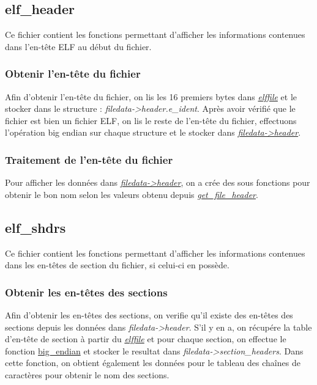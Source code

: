 \documentclass[a4paper]{article} %
\begin{document}

\subsection{elf\_header}
\label{sec:elfheader}
\noindent Ce fichier contient les fonctions permettant d'afficher les informations 
contenues dans l'en-tête ELF au début du fichier.

\subsubsection*{Obtenir l'en-tête du fichier}
\label{sec:getfheader}
Afin d'obtenir l'en-tête du fichier, on lis les 16 premiers bytes dans \hyperref[sec:elffile]{\textit{elffile}}
et le stocker dans le structure : \textit{filedata->header.e\_ident}.
Après avoir vérifié que le fichier est bien un fichier ELF, on lis le 
reste de l'en-tête du fichier, effectuons l'opération big endian sur chaque 
structure et le stocker dans \hyperref[sec:filedata]{\textit{filedata->header}}.

\subsubsection*{Traitement de l'en-tête du fichier}
Pour afficher les données dans \hyperref[sec:filedata]{\textit{filedata->header}}, 
on a crée des sous fonctions pour obtenir le bon nom selon les valeurs obtenu depuis 
\hyperref[sec:getfheader]{\textit{get\_file\_header}}.




\subsection{elf\_shdrs}
\label{sec:sectionheader}
\noindent Ce fichier contient les fonctions permettant d'afficher les informations 
contenues dans les en-têtes de section du fichier, si celui-ci en possède.

\subsubsection*{Obtenir les en-têtes des sections}
Afin d'obtenir les en-têtes des sections, on verifie qu'il existe des en-têtes des 
sections depuis les données dans \textit{filedata->header}. S'il y en a, on
récupére la table d'en-tête de section à partir du \hyperref[sec:elffile]{\textit{elffile}} 
et pour chaque section, on effectue le fonction \hyperref[sec:endian]{big\_endian} et stocker 
le resultat dans \textit{filedata->section\_headers}. Dans cette fonction, on obtient 
également les données pour le tableau des chaînes de caractères pour obtenir le nom 
des sections.
\end{document}
